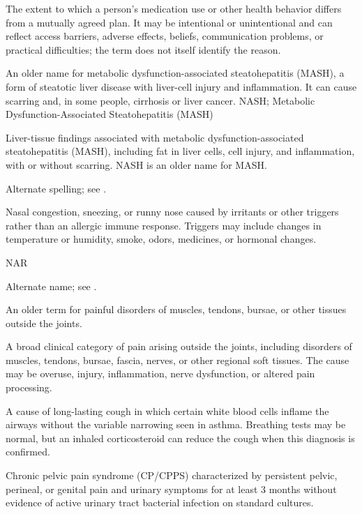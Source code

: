 The extent to which a person's medication use or other health behavior differs from a mutually agreed plan. It may be intentional or unintentional and can reflect access barriers, adverse effects, beliefs, communication problems, or practical difficulties; the term does not itself identify the reason.

 An older name for metabolic dysfunction-associated steatohepatitis (MASH), a form of steatotic liver disease with liver-cell injury and inflammation. It can cause scarring and, in some people, cirrhosis or liver cancer.
\synonyms
NASH; Metabolic Dysfunction-Associated Steatohepatitis (MASH)

 Liver-tissue findings associated with metabolic dysfunction-associated steatohepatitis (MASH), including fat in liver cells, cell injury, and inflammation, with or without scarring. NASH is an older name for MASH.

 Alternate spelling; see .

 Nasal congestion, sneezing, or runny nose caused by irritants or other triggers rather than an allergic immune response. Triggers may include changes in temperature or humidity, smoke, odors, medicines, or hormonal changes.

\synonyms
NAR

 Alternate name; see .

 An older term for painful disorders of muscles, tendons, bursae, or other tissues outside the joints.

 A broad clinical category of pain arising outside the joints, including disorders of muscles, tendons, bursae, fascia, nerves, or other regional soft tissues. The cause may be overuse, injury, inflammation, nerve dysfunction, or altered pain processing.

 A cause of long-lasting cough in which certain white blood cells inflame the airways without the variable narrowing seen in asthma. Breathing tests may be normal, but an inhaled corticosteroid can reduce the cough when this diagnosis is confirmed.

 Chronic pelvic pain syndrome (CP/CPPS) characterized by persistent pelvic, perineal, or genital pain and urinary symptoms for at least 3 months without evidence of active urinary tract bacterial infection on standard cultures.

